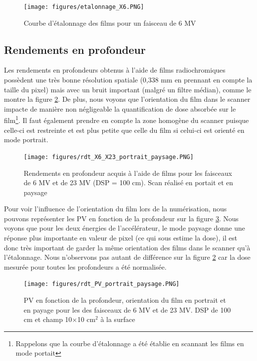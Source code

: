 \documentclass{book}
\begin{document}
\begin{figure}[h]
  \centering
  \texttt{[image: figures/etalonnage\_X6.PNG]}
  \caption{Courbe d'étalonnage des films pour un faisceau de 6 MV}
  \label{fig_courbe_etalonnage}
\end{figure}

\newpage
\subsection{Rendements en profondeur}

Les rendements en profondeurs obtenus à l'aide de films radiochromiques possèdent une très bonne résolution spatiale (0,338 mm en prennant en compte la taille du pixel) mais avec un bruit important (malgré un filtre médian), comme le montre la figure \ref*{fig_rdt_films_X6_X23}. De plus, nous voyons que l'orientation du film dans le scanner impacte de manière non négligeable la quantification de dose absorbée sur le film\footnote{Rappelons que la courbe d'étalonnage a été établie en scannant les films en mode portait}. Il faut également prendre en compte la zone homogène du scanner puisque celle-ci est restreinte et est plus petite que celle du film si celui-ci est orienté en mode portrait. 

\begin{figure}[h]
  \centering
  \texttt{[image: figures/rdt\_X6\_X23\_portrait\_paysage.PNG]}
  \caption{Rendements en profondeur acquis à l'aide de films pour les faisceaux de 6 MV et de 23 MV (DSP = 100 cm). Scan réalisé en portait et en paysage}
  \label{fig_rdt_films_X6_X23}
\end{figure}

Pour voir l'influence de l'orientation du film lors de la numérisation, nous pouvons représenter les PV en fonction de la profondeur sur la figure \ref*{fig_fading_PV}. Nous voyons que pour les deux énergies de l'accélérateur, le mode paysage donne une réponse plus importante en valeur de pixel (ce qui sous estime la dose), il est donc très important de garder la même orientation des films dans le scanner qu'à l'étalonnage. Nous n'observons pas autant de différence sur la figure \ref*{fig_rdt_films_X6_X23} car la dose mesurée pour toutes les profondeurs a été normalisée.

\newpage
\begin{figure}[h]
  \centering
  \texttt{[image: figures/rdt\_PV\_portrait\_paysage.PNG]}
  \caption{PV en fonction de la profondeur, orientation du film en portrait et en payage pour les des faisceaux de 6 MV et de 23 MV. DSP de 100 cm et champ 10$\times$10 cm$^2$ à la surface}
  \label{fig_fading_PV}
\end{figure}
\end{document}
